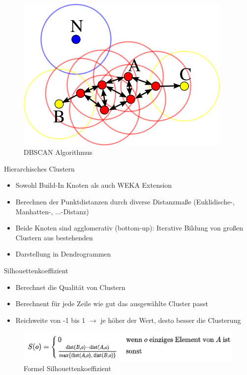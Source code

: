 \documentclass[
	handout,
  	aspectratio=169
]{beamer}
\begin{document}
		\begin{frame}{~}
			\begin{center}
				\begin{figure}[h]
					\includegraphics[scale=0.5]{../pictures/dbscan.png}
					\caption{DBSCAN Algorithmus}		
				\end{figure}		
			\end{center}	
		\end{frame}
		
		\begin{frame}{Hierarchisches Clustern}
			\begin{itemize}
				\item Sowohl Build-In Knoten als auch WEKA Extension
				\item Berechnen der Punktdistanzen durch diverse Distanzmaße (Euklidische-, Manhatten-, ...-Distanz)
				\item Beide Knoten sind agglomerativ (bottom-up): Iterative Bildung von großen Clustern aus bestehenden
				\item Darstellung in Dendrogrammen
			\end{itemize}
		\end{frame}
		
		\begin{frame}{Silhouettenkoeffizient}
			\begin{itemize}
				\item Berechnet die Qualität von Clustern
				\item Berechnent für jede Zeile wie gut das ausgewählte Cluster passt
				\item Reichweite von -1 bis 1 $\rightarrow$ je höher der Wert, desto besser die Clusterung
			\end{itemize}
			\begin{center}
				\begin{figure}[h]
					\includegraphics[scale=1]{../pictures/formel.png}
					\caption{Formel Silhouettenkoeffizient}		
				\end{figure}		
			\end{center}	
		\end{frame}
	
\end{document}
